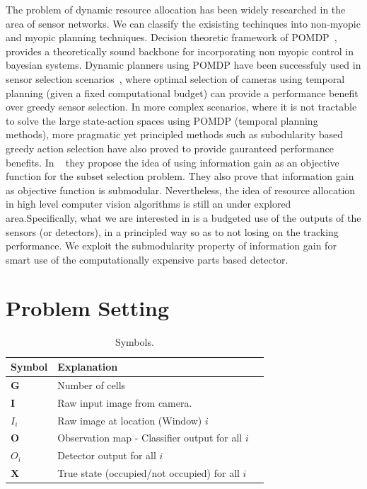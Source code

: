\documentclass[10pt,twocolumn,letterpaper]{article}
\begin{document}
The problem of dynamic resource allocation has been widely researched in the area of sensor networks. We can classify the exisisting techinques into non-myopic and myopic planning techniques.  Decision theoretic framework of POMDP~\cite{Kaelbling98}, provides a theoretically sound backbone for incorporating non myopic control in bayesian systems. Dynamic planners using POMDP have been successfuly used in sensor selection scenarios~\cite{Spaan09}, where optimal selection of cameras using temporal planning (given a  fixed computational budget) can provide a performance benefit over greedy sensor selection. In more complex scenarios, where it is not tractable to solve the large state-action spaces using POMDP (temporal planning methods), more pragmatic yet principled methods such as subodularity based greedy action selection have also proved to provide gauranteed performance benefits. In ~\cite{krause2012near} they propose the idea of using information gain as an objective function for the subset selection problem. They also prove that information gain as objective function is submodular. Nevertheless, the idea of resource allocation in high level computer vision algorithms is still an under explored area.Specifically, what we are interested in is a budgeted use of the outputs of the sensors (or detectors), in a principled way so as to not losing on the tracking performance. We exploit the submodularity property of information gain for smart use of the computationally expensive parts based detector.


\section{Problem Setting}

\begin{table}[ht]
  \begin{tabular}{lll}
   \hline
   Symbol & Explanation \\
   \hline
   $\textbf{G} $ & Number of cells\\
   $ \textbf{I} $ & Raw input image from camera.\\
   $ I_{i} $ & Raw image at location (Window) $ i$\\
   $ \textbf{O} $ & Observation map - Classifier output for all  $ i $\\
   $O_{i} $& Detector output for all $ i $\\
   $\textbf{X}$& True state (occupied/not occupied) for all $i$\\
   \hline
  \end{tabular}
  \caption{%
    Symbols.
  }
  \label{tab:Formal symbols}
\end{table}
\end{document}
